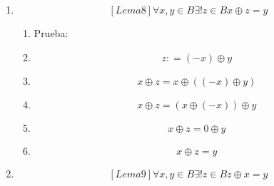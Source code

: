 \begin{enumerate}
\begin{enumerate}
\begin{enumerate}
\begin{enumerate}
        \begin{enumerate}
        \def\labelenumv{\arabic{enumv}.}
        \tightlist
        \item
          \begin{enumerate}
          \def\labelenumvi{\arabic{enumvi}.}
          \tightlist
          \item
            \begin{enumerate}
            \def\labelenumvii{\arabic{enumvii}.}
            \tightlist
            \item
              Prueba:
            \item
              \[y \oplus {x = z} \oplus x\]
            \item
              \[{({- x})} \oplus {{({x \oplus y})} = {({- x})}} \oplus {({x \oplus z})}\]
            \item
              \[\left( {{({- x})} \oplus x} \right) \oplus {y = \left( {{({- x})} \oplus x} \right)} \oplus z\]
            \item
              \[y \oplus {0 = z} \oplus 0\]
            \item
              \[y = z\]
            \end{enumerate}
          \end{enumerate}
        \end{enumerate}
      \item
        \[\left\lbrack {{Lema}8} \right\rbrack\forall x,{y \in B}\exists\mathtt{\mathrm{!}}{z \in B}x \oplus {z = y}\]

        \begin{enumerate}
        \def\labelenumv{\arabic{enumv}.}
        \tightlist
        \item
          Prueba:
        \item
          \[z{: = \left( {- x} \right)} \oplus y\]
        \item
          \[x \oplus {z = x} \oplus \left( {\left( {- x} \right) \oplus y} \right)\]
        \item
          \[x \oplus {z = \left( {x \oplus \left( {- x} \right)} \right)} \oplus y\]
        \item
          \[x \oplus {z = 0} \oplus y\]
        \item
          \[x \oplus {z = y}\]
        \end{enumerate}
      \item
        \[\left\lbrack {{Lema}9} \right\rbrack\forall x,{y \in B}\exists\mathtt{\mathrm{!}}{z \in B}z \oplus {x = y}\]


\end{enumerate}
\end{enumerate}
\end{enumerate}
\end{enumerate}
